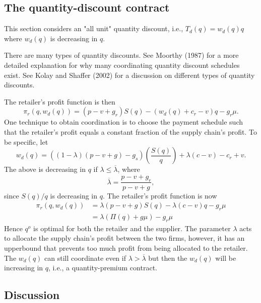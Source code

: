 \subsection{The quantity-discount contract}
This section considers an "all unit" quantity discount, i.e., $T_d(q)=w_d(q)q$ where $w_d(q)$ is decreasing in $q$.
\begin{note}
    There are many types of quantity discounts. See Moorthy (1987) for a more detailed explanation for why many coordinating quantity discount schedules exist. See Kolay and Shaffer (2002) for a discussion on different types of quantity discounts. 
\end{note}
The retailer's profit function is then 
$$\pi_r(q,w_d(q))=(p-v+g_r)S(q)-(w_d(q)+c_r-v)q-g_r\mu.$$
One technique to obtain coordination is to choose the payment schedule such that the retailer's profit equals a constant fraction of the supply chain's profit. To be specific, let 
$$w_d(q)=((1-\lambda)(p-v+g)-g_s)\left(\frac{S(q)}{q}\right)+\lambda(c-v)-c_r+v.$$
The above is decreasing in $q$ if $\lambda\leq\overline{\lambda}$, where 
$$\overline{\lambda}=\frac{p-v+g_r}{p-v+g},$$
since $S(q)/q$ is decreasing in $q$. The retailer's profit function is now 
\begin{align*}
    \pi_r(q,w_d(q))&=\lambda(p-v+g)S(q)-\lambda(c-v)q-g_r\mu\\
    &=\lambda(\Pi(q)+g\mu)-g_r\mu
\end{align*}
Hence $q^o$ is optimal for both the retailer and the supplier. The parameter $\lambda$ acts to allocate the supply chain's profit between the two firms, however, it has an upperbound that prevents too much profit from being allocated to the retailer. The $w_d(q)$ can still coordinate even if $\lambda>\overline{\lambda}$ but then the $w_d(q)$ will be increasing in $q$, i.e., a quantity-premium contract.

\subsection{Discussion}







